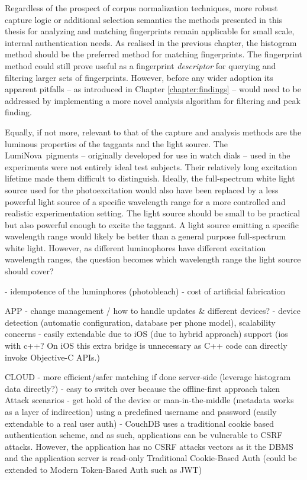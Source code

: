 \documentclass[thesis.tex]{subfiles}
\begin{document}
Regardless of the prospect of corpus normalization techniques, more robust capture logic or additional selection semantics the methods presented in this thesis for analyzing and matching fingerprints remain applicable for small scale, internal authentication needs. As realised in the previous chapter, the histogram method should be the preferred method for matching fingerprints. The fingerprint method could still prove useful as a fingerprint \emph{descriptor} for querying and filtering larger sets of fingerprints. However, before any wider adoption its apparent pitfalls -- as introduced in Chapter \ref{chapter:findings} -- would need to be addressed by implementing a more novel analysis algorithm for filtering and peak finding.

Equally, if not more, relevant to that of the capture and analysis methods are the luminous properties of the taggants and the light source. The LumiNova\textregistered\ pigments -- originally developed for use in watch dials -- used in the experiments were not entirely ideal test subjects. Their relatively long excitation lifetime made them difficult to distinguish. Ideally, the full-spectrum white light source used for the photoexcitation would also have been replaced by a less powerful light source of a specific wavelength range for a more controlled and realistic experimentation setting. The light source should be small to be practical but also powerful enough to excite the taggant. A light source emitting a specific wavelength range would likely be better than a general purpose full-spectrum white light. However, as different luminophores have different excitation wavelength ranges, the question becomes which wavelength range the light source should cover?



- idempotence of the luminphores (photobleach)
- cost of artificial fabrication


APP
- change management / how to handle updates \& different devices?
- device detection (automatic configuration, database per phone model), scalability concerns
- easily extendable due to iOS (due to hybrid approach) support (ios with c++? On iOS this extra bridge is unnecessary as C++ code can directly invoke Objective-C APIs.)

CLOUD
- more efficient/safer matching if done server-side (leverage histogram data directly?)
  - easy to switch over because the offline-first approach taken
Attack scenarios
- get hold of the device or man-in-the-middle (metadata works as a layer of indirection)
using a predefined username and password (easily extendable to a real user auth)
- CouchDB uses a traditional cookie based authentication scheme, and as such, applications can be vulnerable to CSRF attacks. However, the application has no CSRF attacks vectors as it the DBMS and the application server is read-only
Traditional Cookie-Based Auth (could be extended to Modern Token-Based Auth such as JWT)
\end{document}
